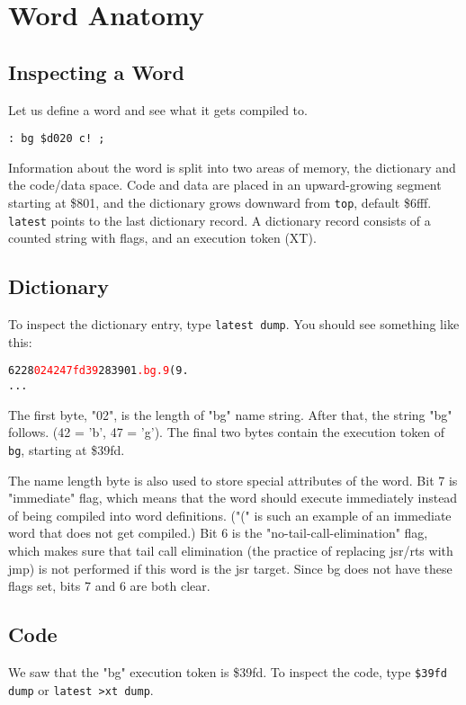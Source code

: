 \chapter{Word Anatomy}

\section{Inspecting a Word}

Let us define a word and see what it gets compiled to.

\begin{verbatim}
: bg $d020 c! ;
\end{verbatim}

Information about the word is split into two areas of memory, the dictionary and the code/data space. Code and data are placed in an upward-growing segment starting at \$801, and the dictionary grows downward from \texttt{top}, default \$6fff. \texttt{latest} points to the last dictionary record. A dictionary record consists of a counted string with flags, and an execution token (XT).

\section{Dictionary}
To inspect the dictionary entry, type \texttt{latest dump}. You should see something like this:

\begin{alltt}
6228  \textcolor{red}{02 42 47 fd 39} 28 39 01 \textcolor{red}{.bg.9}(9.
...
\end{alltt}

The first byte, "02", is the length of "bg" name string. After that, the string "bg" follows. (42 = 'b', 47 = 'g'). The final two bytes contain the execution token of \texttt{bg}, starting at \$39fd.

The name length byte is also used to store special attributes of the word. Bit 7 is "immediate" flag, which means that the word should execute immediately instead of being compiled into word definitions. ("(" is such an example of an immediate word that does not get compiled.) Bit 6 is the "no-tail-call-elimination" flag, which makes sure that tail call elimination (the practice of replacing jsr/rts with jmp) is not performed if this word is the jsr target. Since bg does not have these flags set, bits 7 and 6 are both clear.

\section{Code}
We saw that the "bg" execution token is \$39fd. To inspect the code, type \texttt{\$39fd dump} or \texttt{latest >xt dump}.

